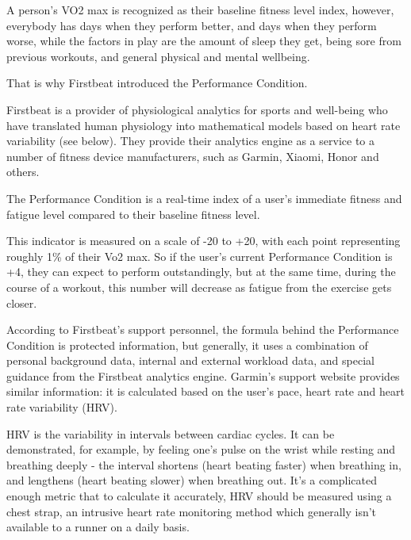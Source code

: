 A person's VO2 max is recognized as their baseline fitness level index, however, everybody has days when they perform better, and days when they perform worse, while the factors in play are the amount of sleep they get, being sore from previous workouts, and general physical and mental wellbeing.

That is why Firstbeat introduced the Performance Condition.

Firstbeat is a provider of physiological analytics for sports and well-being who have translated human physiology into mathematical models based on heart rate variability (see below).
They provide their analytics engine as a service to a number of fitness device manufacturers, such as Garmin, Xiaomi, Honor and others.

The Performance Condition is a real-time index of a user's immediate fitness and fatigue level compared to their baseline fitness level.

This indicator is measured on a scale of -20 to +20, with each point representing roughly 1\% of their Vo2 max.
So if the user's current Performance Condition is +4, they can expect to perform outstandingly,
but at the same time, during the course of a workout, this number will decrease as fatigue from the exercise gets closer.\cite{performance-condition-firstbeat}\cite{performance-condition-garmin}

According to Firstbeat's support personnel, the formula behind the Performance Condition is protected information,
but generally, it uses a combination of personal background data, internal and external workload data, and special guidance from the Firstbeat analytics engine.\cite{firstbeat-performance-condition-emails}
Garmin's support website provides similar information: it is calculated based on the user's pace, heart rate and heart rate variability (HRV).\cite{performance-condition-garmin}

HRV is the variability in intervals between cardiac cycles.
It can be demonstrated, for example, by feeling one's pulse on the wrist while resting and breathing deeply - the interval shortens (heart beating faster) when breathing in, and lengthens (heart beating slower) when breathing out.\cite{hrv}
It's a complicated enough metric that to calculate it accurately, HRV should be measured using a chest strap,
an intrusive heart rate monitoring method which generally isn't available to a runner on a daily basis.

